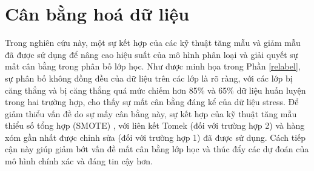 \section{Cân bằng hoá dữ liệu}



Trong nghiên cứu này, một sự kết hợp của các kỹ thuật tăng mẫu và giảm mẫu đã được sử dụng để nâng cao hiệu suất của mô hình phân loại và giải quyết sự mất cân bằng trong phân bố lớp học. Như được minh họa trong Phần \ref{relabel}, sự phân bố không đồng đều của dữ liệu trên các lớp là rõ ràng, với các lớp bị căng thẳng và bị căng thẳng quá mức chiếm hơn 85\% và 65\% dữ liệu huấn luyện trong hai trường hợp, cho thấy sự mất cân bằng đáng kể của dữ liệu stress. Để giảm thiểu vấn đề do sự mấy cân bằng này, sự kết hợp của kỹ thuật tăng mẫu thiểu số tổng hợp (SMOTE) \cite{SMOTE}, với liên kết Tomek \cite{T-links} (đối với trường hợp 2) và hàng xóm gần nhất được chỉnh sửa \cite{ENN} (đối với trường hợp 1) đã được sử dụng. Cách tiếp cận này giúp giảm bớt vấn đề mất cân bằng lớp học và thúc đẩy các dự đoán của mô hình chính xác và đáng tin cậy hơn.

